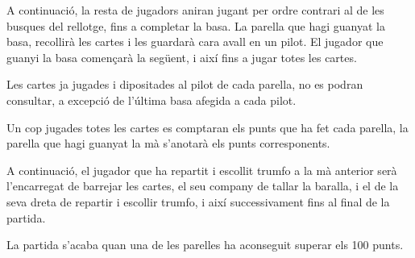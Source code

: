 A continuació, la resta de jugadors aniran jugant per ordre contrari al de les busques del rellotge, fins a completar la basa. La parella que hagi guanyat la basa, recollirà les cartes i les guardarà cara avall en un pilot. El jugador que guanyi la basa començarà la següent, i així fins a jugar totes les cartes.

Les cartes ja jugades i dipositades al pilot de cada parella, no es podran consultar, a excepció de l'última basa afegida a cada pilot.


Un cop jugades totes les cartes es comptaran els punts que ha fet cada parella, la parella que hagi guanyat la mà s'anotarà els punts corresponents.

A continuació, el jugador que ha repartit i escollit trumfo a la mà anterior serà l'encarregat de barrejar les cartes, el seu company de tallar la baralla, i el de la seva dreta de repartir i escollir trumfo, i així successivament fins al final de la partida.


La partida s'acaba quan una de les parelles ha aconseguit superar els 100 punts.

